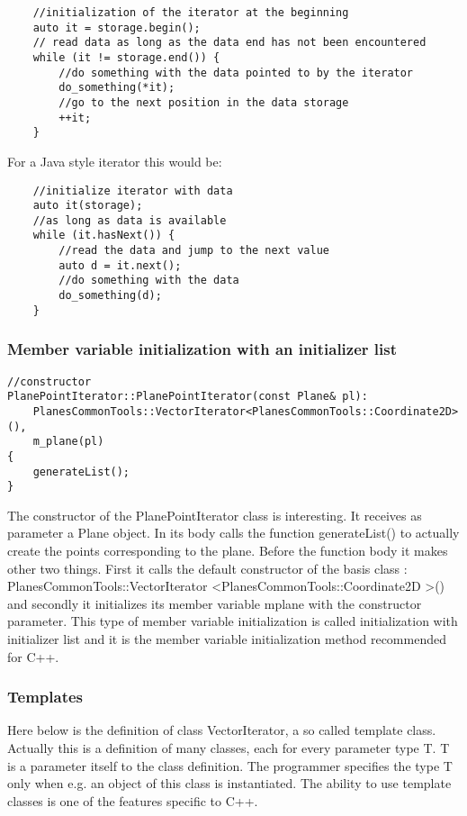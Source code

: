 \begin{lstlisting}
	//initialization of the iterator at the beginning
	auto it = storage.begin();    
	// read data as long as the data end has not been encountered	
	while (it != storage.end()) {  
		//do something with the data pointed to by the iterator		
		do_something(*it);   
		//go to the next position in the data storage 
   		++it;   
	}
\end{lstlisting}

For a Java style iterator this would be:

\begin{lstlisting}
	//initialize iterator with data	
	auto it(storage);     
	//as long as data is available    
	while (it.hasNext()) { 
		//read the data and jump to the next value
		auto d = it.next();  
		//do something with the data
        do_something(d);  
    }
\end{lstlisting}
\subsubsection {Member variable initialization with an initializer list} \label {PPItConstr}

\begin{lstlisting}
//constructor
PlanePointIterator::PlanePointIterator(const Plane& pl):
    PlanesCommonTools::VectorIterator<PlanesCommonTools::Coordinate2D>(),
    m_plane(pl)
{
    generateList();
}
\end{lstlisting}

The constructor of the PlanePointIterator class is interesting. It receives as parameter a Plane object. In its body calls the function generateList() to actually create the points corresponding to the plane. Before the function body it makes other two things. First it calls the default constructor of the basis class : PlanesCommonTools::VectorIterator \textless PlanesCommonTools::Coordinate2D \textgreater() and secondly it initializes its member variable m\textunderscore plane with the constructor parameter. This type of member variable initialization is called initialization with initializer list and it is the member variable initialization method recommended for C++. 

\subsubsection {Templates}

Here below is the definition of class VectorIterator, a so called template class. Actually this is a definition of many classes, each for every parameter type T. T is a parameter itself to the class definition. The programmer specifies the type T only when e.g. an object of this class is instantiated. The ability to use template classes is one of the features specific to C++.

